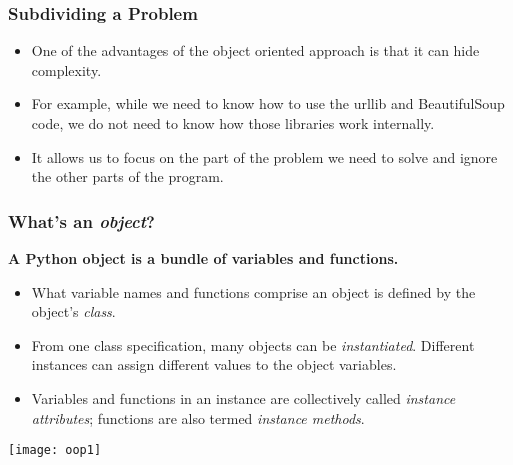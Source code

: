 \begin{frame}[fragile]\frametitle{Subdividing a Problem}
\begin{itemize}
\item One of the advantages of the object oriented approach is that it can hide complexity.
\item For example, while we need to know how to use the urllib and BeautifulSoup code, we do not need to know how those libraries work internally.
\item  It allows us to focus on the part of the problem we need to solve and ignore the other parts of the program.
\end{itemize}




\end{frame}


\begin{frame}[fragile]\frametitle{What's an \emph{object}?}
  \textbf{A Python object is a bundle of variables and functions.}
\begin{itemize}
\item What variable names and functions comprise an object is defined by the object's \emph{class}.

\item From one class specification, many objects can be \emph{instantiated}.  Different instances can assign different values to the object variables.

\item Variables and functions in an instance are collectively called \emph{instance attributes}; functions are also termed \emph{instance methods}.
\end{itemize}

\begin{center}
\texttt{[image: oop1]}
\end{center}

\end{frame}

